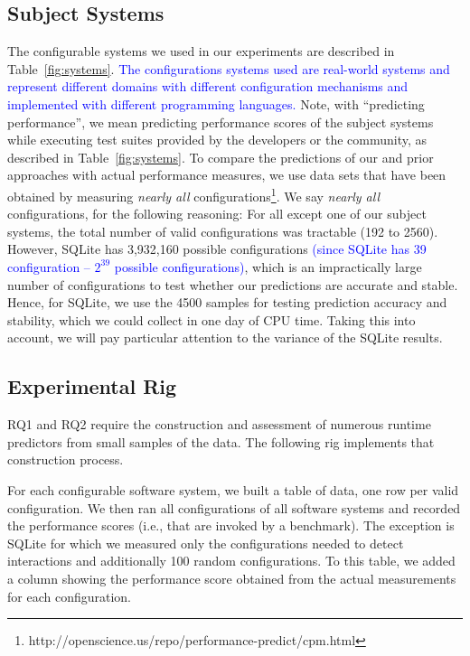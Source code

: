 \documentclass[smallextended]{svjour3}       %
\begin{document}
\subsection{Subject Systems}
\label{sec:subject_systems}
The configurable systems we used in our experiments are described in Table~\ref{fig:systems}.
\textcolor{blue}{The configurations systems used are real-world systems and represent different  domains  with  different  configuration  mechanisms  and  implemented  with different programming languages.}
Note, with ``predicting performance'', we 
mean predicting performance scores of the subject systems while executing test suites provided by the developers or the community, as described in Table~\ref{fig:systems}.
To compare the predictions of our and prior approaches with actual performance measures, we use data sets that have been obtained by
measuring {\em nearly all} configurations\footnote{http://openscience.us/repo/performance-predict/cpm.html}.
We say {\em nearly all} configurations, for the following reasoning: For 
all except one of our subject systems, the total number of valid configurations
was tractable (192 to 2560). However,  SQLite has 3,932,160 
possible configurations \textcolor{blue}{(since SQLite has 39 configuration -- $2^{39}$ possible configurations)}, which is an impractically large number of configurations to test whether our predictions are accurate and stable. Hence, for SQLite, we use the 4500 samples for testing prediction accuracy and stability, which we could collect in one day of CPU time. Taking this into account, we will pay particular attention to the variance of the SQLite results.






\subsection{Experimental Rig}


RQ1 and RQ2 require the construction and assessment of numerous runtime predictors from small samples
of the data. The following rig implements that construction process.

For each configurable software system, we built a table of data, one row per valid configuration. We then ran all configurations of all software systems
and recorded the performance scores (i.e., that are invoked by a benchmark).
The exception is SQLite for which we measured only the
configurations needed to detect interactions and additionally
100 random configurations.  
To this table, we added a column showing the performance score obtained from the actual measurements for each configuration.
\end{document}

